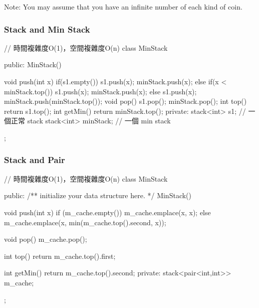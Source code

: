 Note:
You may assume that you have an infinite number of each kind of coin.

\subsubsection{Stack and Min Stack}
\begin{Code}
// 時間複雜度O(1)，空間複雜度O(n)
class MinStack {
public:
    MinStack(){

    }
    void push(int x)
    {
        if(s1.empty())
        {
            s1.push(x);
            minStack.push(x);
        }
        else
        {
            if(x < minStack.top())
            {
                s1.push(x);
                minStack.push(x);
            }
            else
            {
                s1.push(x);
                minStack.push(minStack.top());
            }
        }
    }
    void pop()
    {
        s1.pop();
        minStack.pop();
    }
    int top()
    {
        return s1.top();
    }
    int getMin()
    {
        return minStack.top();
    }
private:
    stack<int> s1; // 一個正常 stack
    stack<int> minStack; // 一個 min stack
};
\end{Code}

\subsubsection{Stack and Pair}
\begin{Code}
// 時間複雜度O(1)，空間複雜度O(n)
class MinStack {
public:
    /** initialize your data structure here. */
    MinStack() {

    }

    void push(int x) {
        if (m_cache.empty())
            m_cache.emplace(x, x);
        else
            m_cache.emplace(x, min(m_cache.top().second, x));
    }

    void pop() {
        m_cache.pop();
    }

    int top() {
        return m_cache.top().first;
    }

    int getMin() {
        return m_cache.top().second;
    }
private:
    stack<pair<int,int>> m_cache;
};
\end{Code}
